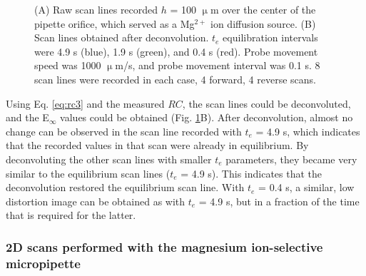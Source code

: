 \begin{figure}[h]
\centering
{}

\caption[Raw, and deconvoluted linescans conducted with the Mg$^{2+}$ ISME]{(A) Raw scan lines recorded $h$ = 100 $\upmu$m over the center of the pipette orifice, which served as a Mg$^{2+}$ ion diffusion source.
(B) Scan lines obtained after deconvolution.
$t_e$ equilibration intervals were 4.9 s (blue), 1.9 s (green), and 0.4 s (red).
Probe movement speed was 1000 $\upmu$m/s, and probe movement interval was 0.1 s.
8 scan lines were recorded in each case, 4 forward, 4 reverse scans.}
\label{fig:lines}
\end{figure}


Using Eq. \ref{eq:rc3} and the measured $RC$, the scan lines could be deconvoluted, and the E$_{\infty}$ values could be obtained (Fig. \ref{fig:lines}B).
After deconvolution, almost no change can be observed in the scan line recorded with $t_e$ = 4.9 s, which indicates that the recorded values in that scan were already in equilibrium.
By deconvoluting the other scan lines with smaller $t_e$ parameters, they became very similar to the equilibrium scan lines ($t_e$ = 4.9 s).
This indicates that the deconvolution restored the equilibrium scan line.
With $t_e$ = 0.4 s, a similar, low distortion image can be obtained as with $t_e$ = 4.9 s, but in a fraction of the time that is required for the latter.

			\subsubsection{2D scans performed with the magnesium ion-selective micropipette}

